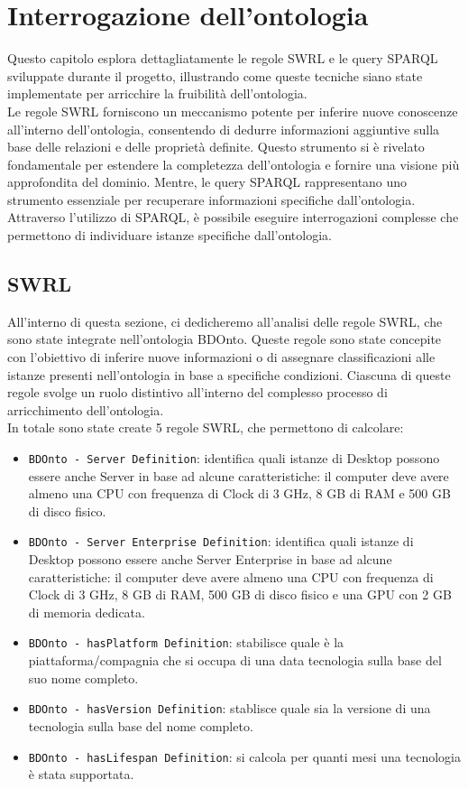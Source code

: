 \chapter{Interrogazione dell'ontologia}
Questo capitolo esplora dettagliatamente le regole SWRL e le query SPARQL sviluppate durante il progetto, illustrando come queste tecniche siano state implementate per arricchire la fruibilità dell'ontologia.\\

Le regole SWRL forniscono un meccanismo potente per inferire nuove conoscenze all'interno dell'ontologia, consentendo di dedurre informazioni aggiuntive sulla base delle relazioni e delle proprietà definite. Questo strumento si è rivelato fondamentale per estendere la completezza dell'ontologia e fornire una visione più approfondita del dominio. Mentre, le query SPARQL rappresentano uno strumento essenziale per recuperare informazioni specifiche dall'ontologia. Attraverso l'utilizzo di SPARQL, è possibile eseguire interrogazioni complesse che permettono di individuare istanze specifiche dall'ontologia.

\section{SWRL}\label{sec:swrl}
All'interno di questa sezione, ci dedicheremo all'analisi delle regole SWRL, che sono state integrate nell'ontologia BDOnto. Queste regole sono state concepite con l'obiettivo di inferire nuove informazioni o di assegnare classificazioni alle istanze presenti nell'ontologia in base a specifiche condizioni. Ciascuna di queste regole svolge un ruolo distintivo all'interno del complesso processo di arricchimento dell'ontologia.\\

In totale sono state create 5 regole SWRL, che permettono di calcolare:
\begin{itemize}
    \item \texttt{BDOnto - Server Definition}: identifica quali istanze di Desktop possono essere anche Server in base ad alcune caratteristiche: il computer deve avere almeno una CPU con frequenza di Clock di 3 GHz, 8 GB di RAM e 500 GB di disco fisico.
    \item \texttt{BDOnto - Server Enterprise Definition}: identifica quali istanze di Desktop possono essere anche Server Enterprise in base ad alcune caratteristiche: il computer deve avere almeno una CPU con frequenza di Clock di 3 GHz, 8 GB di RAM, 500 GB di disco fisico e una GPU con 2 GB di memoria dedicata.
    \item \texttt{BDOnto - hasPlatform Definition}: stabilisce quale è la piattaforma/compagnia che si occupa di una data tecnologia sulla base del suo nome completo.
    \item \texttt{BDOnto - hasVersion Definition}: stablisce quale sia la versione di una tecnologia sulla base del nome completo.
    \item \texttt{BDOnto - hasLifespan Definition}: si calcola per quanti mesi una tecnologia è stata supportata.
\end{itemize}

